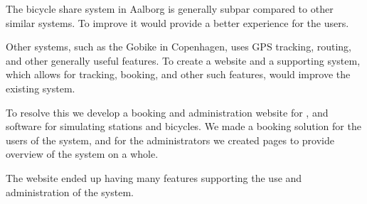 The bicycle share system in Aalborg is generally subpar compared to other similar systems.
To improve it would provide a better experience for the users.

Other systems, such as the Gobike in Copenhagen, uses GPS tracking, routing, and other generally useful features. 
To create a website and a supporting system, which allows for tracking, booking, and other such features, would improve the existing system.

To resolve this we develop a booking and administration website for \bycykelwithoutspace, and software for simulating stations and bicycles. We made a booking solution for the users of the system, and for the administrators we created pages to provide overview of the system on a whole.

The website ended up having many features supporting the use and administration of the system.